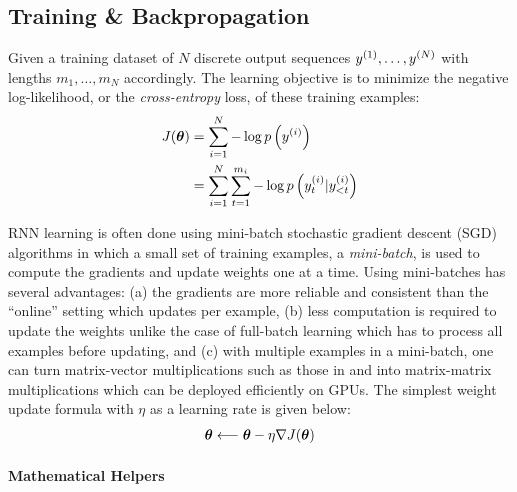 

\subsection{Training \& Backpropagation}
Given a training dataset of $N$ discrete output sequences $y^{(1)}, \ldots,
y^{(N)}$ with lengths $m_1, \ldots, m_N$ accordingly. The learning objective is
to minimize the negative log-likelihood, or the {\it cross-entropy} loss, of these training examples:
\begin{align}
J(\bm{\theta}) &= \sum_{i=1}^{N} -\log p\left(y^{(i)}\right) \\ 
&= \sum_{i=1}^{N} \sum_{t=1}^{m_i} -\log p\left(y^{(i)}_t |
y^{(i)}_{<t}\right)
\label{e:objective}
\end{align}

RNN learning is often done using mini-batch stochastic gradient descent (SGD) algorithms in
which a small set of training examples, a {\it mini-batch}, is used to compute
the gradients and update weights one at a time. Using mini-batches has
several advantages: (a) the gradients are more reliable and consistent than the
``online'' setting which updates per example, (b) less computation is required to
update the weights unlike the case of full-batch learning which has to process
all examples before updating, and (c) with multiple examples in a mini-batch,
one can turn matrix-vector multiplications such
as those in  and  into matrix-matrix multiplications which can be
deployed efficiently on GPUs. The simplest weight update formula with $\eta$ as
a learning rate is given below:
\begin{align}
\thetav \longleftarrow \thetav - \eta \grad{J(\thetav)} %
\end{align}

\paragraph{Mathematical Helpers}

